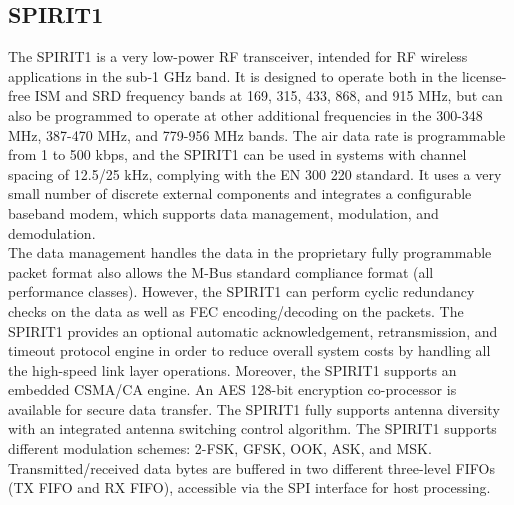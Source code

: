 \subsection{SPIRIT1}
The SPIRIT1 is a very low-power RF transceiver, intended for RF wireless applications in the sub-1 GHz band. It is designed to operate both in the license-free ISM and SRD frequency bands at 169, 315, 433, 868, and 915 MHz, but can also be programmed to operate at other additional frequencies in the 300-348 MHz, 387-470 MHz, and 779-956 MHz bands. The air data rate is programmable from 1 to 500 kbps, and the SPIRIT1 can be used in systems with channel spacing of 12.5/25 kHz, complying with the EN 300 220 standard. It uses a very small number of discrete external components and integrates a configurable baseband modem, which supports data management, modulation, and demodulation.\\
The data management handles the data in the proprietary fully programmable packet format also allows the M-Bus standard compliance format (all performance classes). However, the SPIRIT1 can perform cyclic redundancy checks on the data as well as FEC encoding/decoding on the packets. The SPIRIT1 provides an optional automatic acknowledgement, retransmission, and timeout protocol engine in order to reduce overall system costs by handling all the high-speed link layer operations. Moreover, the SPIRIT1 supports an embedded CSMA/CA engine. An AES 128-bit encryption co-processor is available for secure data transfer. The SPIRIT1 fully supports antenna diversity with an integrated antenna switching control algorithm. The SPIRIT1 supports different modulation schemes: 2-FSK, GFSK, OOK, ASK, and MSK. Transmitted/received data bytes are buffered in two different three-level FIFOs (TX FIFO and RX FIFO), accessible via the SPI interface for host processing.
